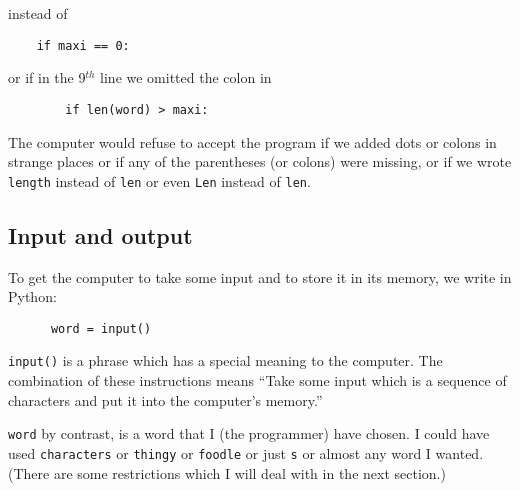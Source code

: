 instead of 

\begin{Verbatim}
    if maxi == 0:
\end{Verbatim}

or if in the 9$^{th}$ line we omitted the colon in

\begin{Verbatim}
        if len(word) > maxi:
\end{Verbatim}

The computer would refuse to accept the program if we added dots or colons
in strange places
or if any of the parentheses (or colons) were missing, or if we wrote
\verb!length! instead of \verb!len! or even \verb!Len! instead of \verb!len!.

% 

\subsection{Input and output}

To get the computer to take some input and to store it
in its memory, we write in Python:

\begin{Verbatim}
      word = input()
\end{Verbatim}

\verb!input()!
is a phrase which has a special meaning to
the computer. The combination of these instructions
means
``Take some input which is a sequence of characters and put it into the computer's memory.''

\verb!word! by contrast, is a word that I (the programmer) have chosen.
I could have used \verb!characters! or \verb!thingy! or \verb!foodle!
or just \verb!s! or almost any word I wanted. (There are some
restrictions which I will deal with in the next section.)  

